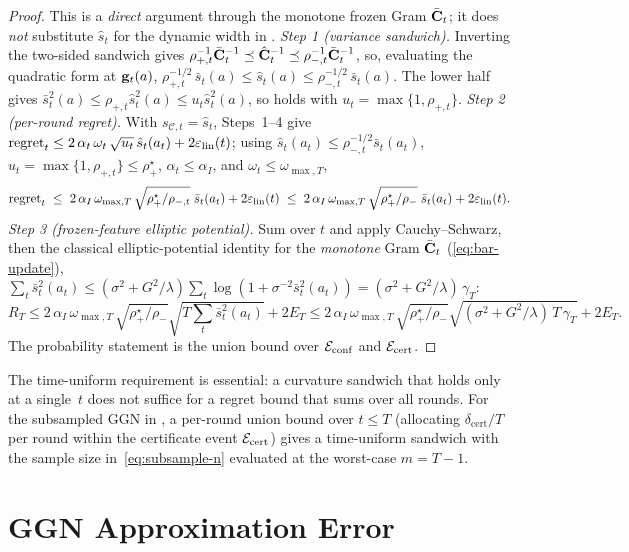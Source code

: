 \documentclass[twoside]{article}
\newcommand{\Calg}{\mathcal{C}}                 %
\begin{document}
\begin{proof}
This is a \emph{direct} argument through the monotone frozen Gram $\bar{\mathbf{C}}_t$; it
does \emph{not} substitute $\hat s_t$ for the dynamic width in
.
\emph{Step 1 (variance sandwich).}  Inverting the two-sided sandwich gives
$\rho_{+,t}^{-1}\bar{\mathbf{C}}_t^{-1}\preceq\hat{\mathbf{C}}_t^{-1}\preceq\rho_{-,t}^{-1}\bar{\mathbf{C}}_t^{-1}$,
so, evaluating the quadratic form at $\mathbf{g}_t(a)$,
$\rho_{+,t}^{-1/2}\,\bar s_t(a)\le\hat s_t(a)\le\rho_{-,t}^{-1/2}\,\bar s_t(a)$.
The lower half gives $\bar s_t^2(a)\le\rho_{+,t}\hat s_t^2(a)\le u_t\hat s_t^2(a)$,
so  holds with $u_t=\max\{1,\rho_{+,t}\}$.
\emph{Step 2 (per-round regret).}  With $s_{\Calg,t}=\hat s_t$,
 Steps~1--4 give
$\mathrm{regret}_t\le
2\,\alpha_t\,\omega_t\,\sqrt{u_t}\,\hat s_t(a_t)+2\varepsilon_{\mathrm{lin}}(t)$; using
$\hat s_t(a_t)\le\rho_{-,t}^{-1/2}\bar s_t(a_t)$,
$u_t=\max\{1,\rho_{+,t}\}\le\rho_+^{\star}$,
$\alpha_t\le\alpha_I$, and $\omega_t\le\omega_{\max,T}$,
\[
  \mathrm{regret}_t
  \;\le\;
  2\,\alpha_I\,\omega_{\max,T}\,\sqrt{\rho_+^{\star}/\rho_{-,t}}\;\bar s_t(a_t)
  +2\varepsilon_{\mathrm{lin}}(t)
  \;\le\;
  2\,\alpha_I\,\omega_{\max,T}\,\sqrt{\rho_+^{\star}/\rho_-}\;\bar s_t(a_t)
  +2\varepsilon_{\mathrm{lin}}(t).
\]
\emph{Step 3 (frozen-feature elliptic potential).}  Sum over $t$ and apply
Cauchy--Schwarz, then the classical elliptic-potential identity for the
\emph{monotone} Gram $\bar{\mathbf{C}}_t$ (\eqref{eq:bar-update}),
$\sum_{t}\bar s_t^2(a_t)\le(\sigma^2+G^2/\lambda)\sum_t\log(1+\sigma^{-2}
\bar s_t^2(a_t))=(\sigma^2+G^2/\lambda)\,\gamma_T$:
\[
  R_T\le 2\,\alpha_I\,\omega_{\max,T}\,\sqrt{\rho_+^{\star}/\rho_-}
  \sqrt{T\sum_t\bar s_t^2(a_t)}+2E_T
  \le 2\,\alpha_I\,\omega_{\max,T}\,\sqrt{\rho_+^{\star}/\rho_-}
  \sqrt{(\sigma^2+G^2/\lambda)\,T\,\gamma_T}+2E_T.
\]
The probability statement is the union bound over $\mathcal{E}_{\mathrm{conf}}$ and
$\mathcal{E}_{\mathrm{cert}}$.
\end{proof}

\noindent
The time-uniform requirement is essential: a curvature sandwich that holds
only at a single~$t$ does not suffice for a regret bound that sums over all
rounds.  For the subsampled GGN in , a per-round union bound
over $t\le T$ (allocating $\delta_{\mathrm{cert}}/T$ per round within the
certificate event $\mathcal{E}_{\mathrm{cert}}$) gives a time-uniform sandwich with the
sample size in~\eqref{eq:subsample-n} evaluated at the worst-case $m=T{-}1$.



\section{GGN Approximation Error}\label{app:ggn-approx}
\end{document}
